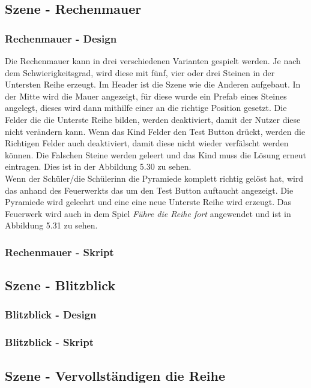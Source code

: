 \subsection{Szene - Rechenmauer}
\subsubsection{Rechenmauer - Design}
Die Rechenmauer kann in drei verschiedenen Varianten gespielt werden. Je nach dem Schwierigkeitsgrad, wird diese mit fünf, vier oder drei Steinen in der Untersten Reihe erzeugt. Im Header ist die Szene wie die Anderen aufgebaut. In der Mitte wird die Mauer angezeigt, für diese wurde ein Prefab eines Steines angelegt, dieses wird dann mithilfe einer  an die richtige Position gesetzt. Die Felder die die Unterste Reihe bilden, werden deaktiviert, damit der Nutzer diese nicht verändern kann. Wenn das Kind Felder den Test Button drückt, werden die Richtigen Felder auch deaktiviert, damit diese nicht wieder verfälscht werden können. Die Falschen Steine werden geleert und das Kind muss die Lösung erneut eintragen. Dies ist in der Abbildung 5.30 zu sehen.\\
Wenn der Schüler/die Schülerinn die Pyramiede komplett richtig gelöst hat, wird das anhand des Feuerwerkts das um den Test Button auftaucht angezeigt. Die Pyramiede wird geleehrt und eine eine neue Unterste Reihe wird erzeugt. Das Feuerwerk wird auch in dem Spiel \textit{Führe die Reihe fort} angewendet und ist in Abbildung 5.31 zu sehen.
\subsubsection{Rechenmauer - Skript}
\subsection{Szene - Blitzblick}
\subsubsection{Blitzblick - Design}
\subsubsection{Blitzblick - Skript}
\subsection{Szene - Vervollständigen die Reihe}
